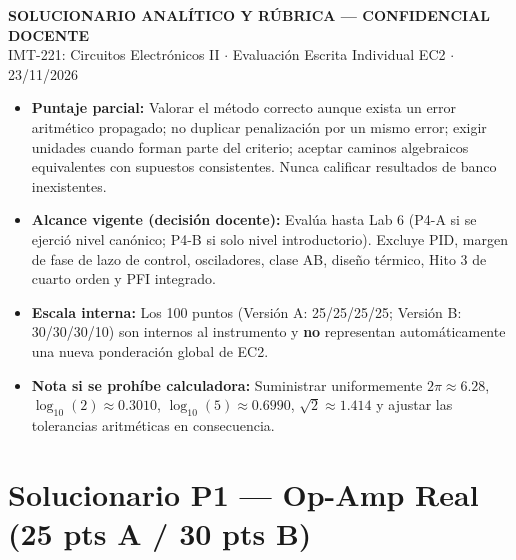 \documentclass[10pt, a4paper]{article}
\begin{document}
\begin{center}
    {\Large\textbf{\textcolor{docred}{SOLUCIONARIO ANALÍTICO Y RÚBRICA --- CONFIDENCIAL DOCENTE}}}\\[0.08cm]
    {\normalsize IMT-221: Circuitos Electrónicos II $\cdot$ Evaluación Escrita Individual EC2 $\cdot$ 23/11/2026}
\end{center}

\begin{tcolorbox}[colback=warnbg, colframe=docred, title=\textbf{Reglas de Corrección, Puntaje Parcial y Dictamen de Alcance}]
    \footnotesize
    \begin{itemize}
        \setlength{\itemsep}{2pt}
        \item \textbf{Puntaje parcial:} Valorar el método correcto aunque exista un error aritmético propagado; no duplicar penalización por un mismo error; exigir unidades cuando forman parte del criterio; aceptar caminos algebraicos equivalentes con supuestos consistentes. Nunca calificar resultados de banco inexistentes.
        \item \textbf{Alcance vigente (decisión docente):} Evalúa hasta Lab 6 (P4-A si se ejerció nivel canónico; P4-B si solo nivel introductorio). Excluye PID, margen de fase de lazo de control, osciladores, clase AB, diseño térmico, Hito 3 de cuarto orden y PFI integrado.
        \item \textbf{Escala interna:} Los 100 puntos (Versión A: 25/25/25/25; Versión B: 30/30/30/10) son internos al instrumento y \textbf{no} representan automáticamente una nueva ponderación global de EC2.
        \item \textbf{Nota si se prohíbe calculadora:} Suministrar uniformemente $2\pi \approx 6.28$, $\log_{10}(2) \approx 0.3010$, $\log_{10}(5) \approx 0.6990$, $\sqrt{2} \approx 1.414$ y ajustar las tolerancias aritméticas en consecuencia.
    \end{itemize}
\end{tcolorbox}

\section*{Solucionario P1 --- Op-Amp Real (25 pts A / 30 pts B)}
\end{document}
